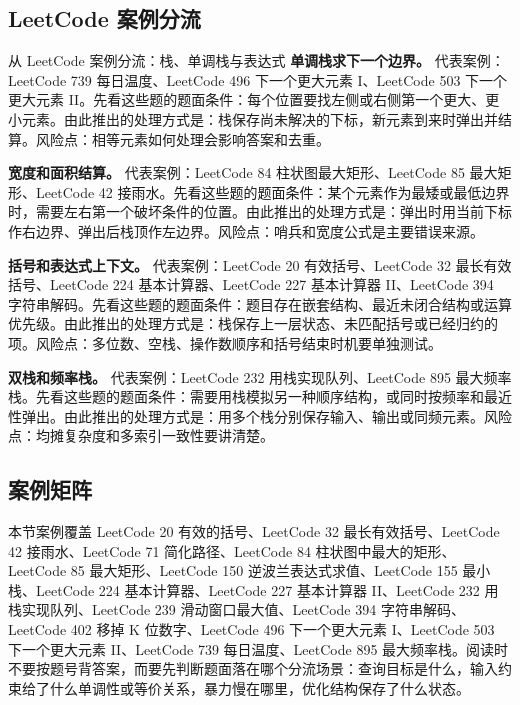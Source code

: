 \subsection{LeetCode 案例分流}

\begin{principlebox}{从 LeetCode 案例分流：栈、单调栈与表达式}
\textbf{单调栈求下一个边界。}
代表案例：LeetCode 739 每日温度、LeetCode 496 下一个更大元素 I、LeetCode 503 下一个更大元素 II。先看这些题的题面条件：每个位置要找左侧或右侧第一个更大、更小元素。由此推出的处理方式是：栈保存尚未解决的下标，新元素到来时弹出并结算。风险点：相等元素如何处理会影响答案和去重。

\textbf{宽度和面积结算。}
代表案例：LeetCode 84 柱状图最大矩形、LeetCode 85 最大矩形、LeetCode 42 接雨水。先看这些题的题面条件：某个元素作为最矮或最低边界时，需要左右第一个破坏条件的位置。由此推出的处理方式是：弹出时用当前下标作右边界、弹出后栈顶作左边界。风险点：哨兵和宽度公式是主要错误来源。

\textbf{括号和表达式上下文。}
代表案例：LeetCode 20 有效括号、LeetCode 32 最长有效括号、LeetCode 224 基本计算器、LeetCode 227 基本计算器 II、LeetCode 394 字符串解码。先看这些题的题面条件：题目存在嵌套结构、最近未闭合结构或运算优先级。由此推出的处理方式是：栈保存上一层状态、未匹配括号或已经归约的项。风险点：多位数、空栈、操作数顺序和括号结束时机要单独测试。

\textbf{双栈和频率栈。}
代表案例：LeetCode 232 用栈实现队列、LeetCode 895 最大频率栈。先看这些题的题面条件：需要用栈模拟另一种顺序结构，或同时按频率和最近性弹出。由此推出的处理方式是：用多个栈分别保存输入、输出或同频元素。风险点：均摊复杂度和多索引一致性要讲清楚。

\end{principlebox}

\subsection{案例矩阵}

本节案例覆盖 LeetCode 20 有效的括号、LeetCode 32 最长有效括号、LeetCode 42 接雨水、LeetCode 71 简化路径、LeetCode 84 柱状图中最大的矩形、LeetCode 85 最大矩形、LeetCode 150 逆波兰表达式求值、LeetCode 155 最小栈、LeetCode 224 基本计算器、LeetCode 227 基本计算器 II、LeetCode 232 用栈实现队列、LeetCode 239 滑动窗口最大值、LeetCode 394 字符串解码、LeetCode 402 移掉 K 位数字、LeetCode 496 下一个更大元素 I、LeetCode 503 下一个更大元素 II、LeetCode 739 每日温度、LeetCode 895 最大频率栈。阅读时不要按题号背答案，而要先判断题面落在哪个分流场景：查询目标是什么，输入约束给了什么单调性或等价关系，暴力慢在哪里，优化结构保存了什么状态。

